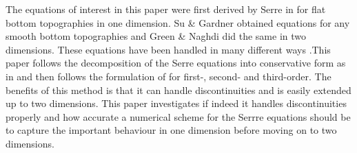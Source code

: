 \documentclass[SingleSpace,12pt]{Serre_ASCE}
\begin{document}
The equations of interest in this paper were first derived by Serre in \cite{Serre-F-1953-857} for flat bottom topographies in one dimension. Su \& Gardner \cite{Su-Gardener-1969-536} obtained equations for any smooth bottom topographies and Green \& Naghdi \cite{Green-Naghdi-1976-237} did the same in two dimensions. These equations have been handled in many different ways \cite{Dutykh-2014-315,Bonneton-etal-2011-1479,Antunes-do-Carmo-etal-1993-725,Chazel-etal-2011-105,Barthelemy-2006-51-1217,Barthelemy-2007-53-1423,Clamond-2011-315}.This paper follows the decomposition of the Serre equations into conservative form as in \cite{Hank-etal-2010-2034,Guyenne-etal-2014-169} and then follows the formulation of \cite{Hank-etal-2010-2034} for first-, second- and third-order. The benefits of this method is that it can handle discontinuities and is easily extended up to two dimensions. This paper investigates if indeed it handles discontinuities properly and how accurate a numerical scheme for the Serrre equations should be to capture the important behaviour in one dimension before moving on to two dimensions.    

\end{document}
